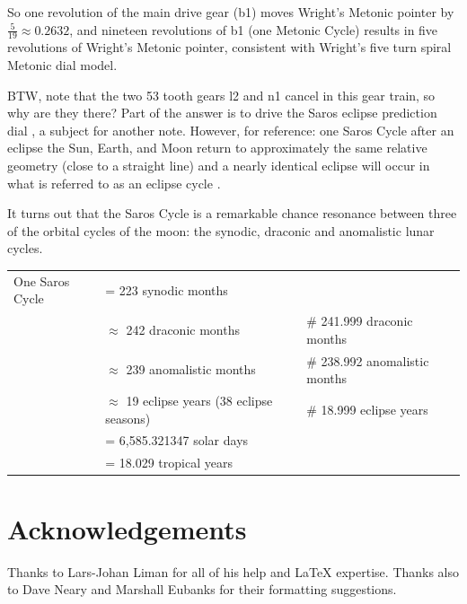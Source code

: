\documentclass[11pt, oneside]{article}   	%
\theoremstyle{definition}
\begin{document}
\bigskip
\bigskip
\noindent
So one revolution of the main drive gear (b1) moves Wright's Metonic pointer by $\frac{5}{19} \approx 0.2632$, and nineteen revolutions of b1 (one Metonic Cycle) results in five
revolutions of Wright's Metonic pointer, consistent with Wright's five turn spiral Metonic dial model.


\bigskip
\noindent
BTW, note that the two 53 tooth gears l2 and n1 cancel in this gear train, so why are they there? 
Part of the answer is to drive the Saros eclipse prediction dial \cite{pmid25075747}, a subject for another note. 
However,  for reference: one Saros Cycle after an eclipse the Sun, Earth, and Moon return to approximately the same 
relative geometry (close to a straight line) and a nearly identical eclipse will occur in what is referred to as an eclipse 
cycle \cite{wiki:saros}. 

\bigskip
\noindent
It turns out that the Saros Cycle is a remarkable chance resonance between three of the orbital cycles of the moon: the synodic, draconic and anomalistic 
lunar cycles.

\begin{flushleft}
\begin{tabular}{@{}l@{\ }l@{\qquad}l}
  One Saros Cycle
  & = 223 synodic months                                                                                                \\
  & $\approx$ 242 draconic months                           &\# 241.999 draconic months       \\
  & $\approx$ 239 anomalistic months                       & \# 238.992 anomalistic months \\
  & $\approx$ 19 eclipse years (38 eclipse seasons) & \# 18.999 eclipse years             \\
  & = 6,585.321347 solar days                                                                                         \\
  & = 18.029  tropical years            
\end{tabular}
\end{flushleft}

\bigskip
\section*{Acknowledgements}

Thanks to Lars-Johan Liman for all of his help and LaTeX expertise. Thanks also to Dave Neary and Marshall Eubanks for their formatting suggestions.



\end{document}
